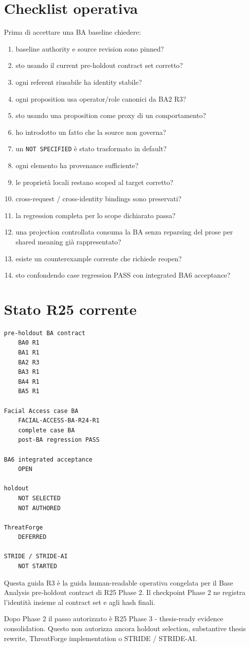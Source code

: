 \documentclass[11pt,a4paper]{article}
\newcommand{\code}[1]{\nolinkurl{#1}}
\begin{document}
\section{Checklist operativa}

Prima di accettare una BA baseline chiedere:

\begin{enumerate}
\item baseline authority e source revision sono pinned?
\item sto usando il current pre-holdout contract set corretto?
\item ogni referent riusabile ha identity stabile?
\item ogni proposition usa operator/role canonici da BA2 R3?
\item sto usando una proposition come proxy di un comportamento?
\item ho introdotto un fatto che la source non governa?
\item un \code{NOT SPECIFIED} è stato trasformato in default?
\item ogni elemento ha provenance sufficiente?
\item le proprietà locali restano scoped al target corretto?
\item cross-request / cross-identity bindings sono preservati?
\item la regression completa per lo scope dichiarato passa?
\item una projection controllata consuma la BA senza reparsing del prose per shared meaning già rappresentato?
\item esiste un counterexample corrente che richiede reopen?
\item sto confondendo case regression PASS con integrated BA6 acceptance?
\end{enumerate}

\section{Stato R25 corrente}

\begin{lstlisting}
pre-holdout BA contract
    BA0 R1
    BA1 R1
    BA2 R3
    BA3 R1
    BA4 R1
    BA5 R1

Facial Access case BA
    FACIAL-ACCESS-BA-R24-R1
    complete case BA
    post-BA regression PASS

BA6 integrated acceptance
    OPEN

holdout
    NOT SELECTED
    NOT AUTHORED

ThreatForge
    DEFERRED

STRIDE / STRIDE-AI
    NOT STARTED
\end{lstlisting}

Questa guida R3 è la guida human-readable operativa congelata per il Base Analysis pre-holdout contract di R25 Phase 2. Il checkpoint Phase 2 ne registra l'identità insieme al contract set e agli hash finali.

Dopo Phase 2 il passo autorizzato è R25 Phase 3 - thesis-ready evidence consolidation. Questo non autorizza ancora holdout selection, substantive thesis rewrite, ThreatForge implementation o STRIDE / STRIDE-AI.
\end{document}
